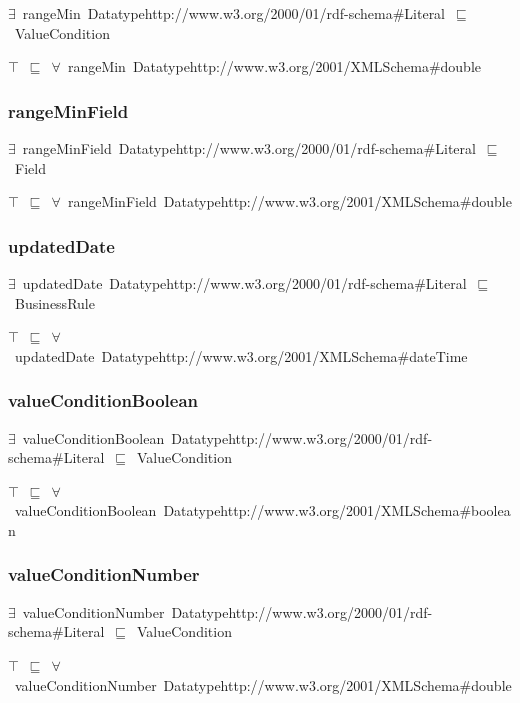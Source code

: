 \documentclass{article}
\begin{document}
\ensuremath{\exists}~rangeMin~Datatypehttp://www.w3.org/2000/01/rdf-schema#Literal~\ensuremath{\sqsubseteq}~ValueCondition

\ensuremath{\top}~\ensuremath{\sqsubseteq}~\ensuremath{\forall}~rangeMin~Datatypehttp://www.w3.org/2001/XMLSchema#double

\subsubsection*{rangeMinField}

\ensuremath{\exists}~rangeMinField~Datatypehttp://www.w3.org/2000/01/rdf-schema#Literal~\ensuremath{\sqsubseteq}~Field

\ensuremath{\top}~\ensuremath{\sqsubseteq}~\ensuremath{\forall}~rangeMinField~Datatypehttp://www.w3.org/2001/XMLSchema#double

\subsubsection*{updatedDate}

\ensuremath{\exists}~updatedDate~Datatypehttp://www.w3.org/2000/01/rdf-schema#Literal~\ensuremath{\sqsubseteq}~BusinessRule

\ensuremath{\top}~\ensuremath{\sqsubseteq}~\ensuremath{\forall}~updatedDate~Datatypehttp://www.w3.org/2001/XMLSchema#dateTime

\subsubsection*{valueConditionBoolean}

\ensuremath{\exists}~valueConditionBoolean~Datatypehttp://www.w3.org/2000/01/rdf-schema#Literal~\ensuremath{\sqsubseteq}~ValueCondition

\ensuremath{\top}~\ensuremath{\sqsubseteq}~\ensuremath{\forall}~valueConditionBoolean~Datatypehttp://www.w3.org/2001/XMLSchema#boolean

\subsubsection*{valueConditionNumber}

\ensuremath{\exists}~valueConditionNumber~Datatypehttp://www.w3.org/2000/01/rdf-schema#Literal~\ensuremath{\sqsubseteq}~ValueCondition

\ensuremath{\top}~\ensuremath{\sqsubseteq}~\ensuremath{\forall}~valueConditionNumber~Datatypehttp://www.w3.org/2001/XMLSchema#double
\end{document}

